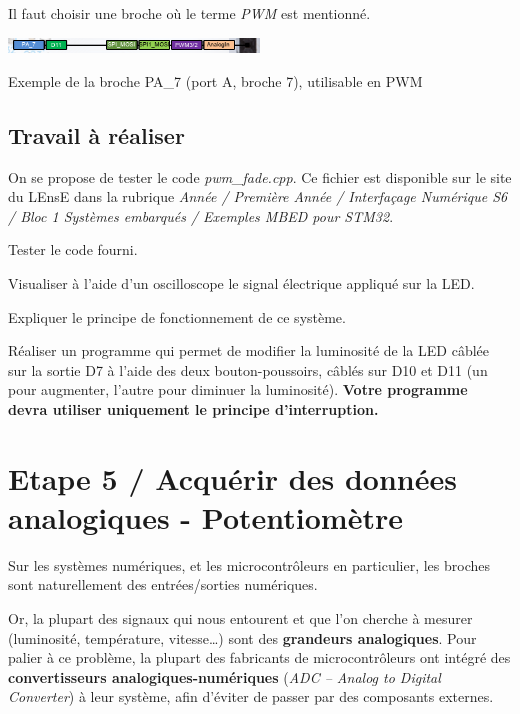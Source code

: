 \documentclass[a4paper,11pt,titlepage]{article} %
\begin{document}
Il faut choisir une broche où le terme \textit{PWM} est mentionné.

\begin{center}
	\includegraphics[width=0.5\textwidth]{images/nucleo_pin_functions.png}
	
	Exemple de la broche PA\_7 (port A, broche 7), utilisable en PWM
\end{center}

\subsection{Travail à réaliser}


On se propose de tester le code \textsl{pwm\_fade.cpp}. Ce fichier est disponible sur le site du LEnsE dans la rubrique \textit{Année / Première Année / Interfaçage Numérique S6 / Bloc 1 Systèmes embarqués / Exemples MBED pour STM32}.

\Manip Tester le code fourni. 

\Manip Visualiser à l'aide d'un oscilloscope le signal électrique appliqué sur la LED.

\Quest Expliquer le principe de fonctionnement de ce système.

\Manip Réaliser un programme qui permet de modifier la luminosité de la LED câblée sur la sortie D7 à l'aide des deux bouton-poussoirs, câblés sur D10 et D11 (un pour augmenter, l'autre pour diminuer la luminosité). \textbf{Votre programme devra utiliser uniquement le principe d'interruption.}


\newpage
\section{Etape 5 / Acquérir des données analogiques - Potentiomètre}

Sur les systèmes numériques, et les microcontrôleurs en particulier, les broches sont naturellement des entrées/sorties numériques.

Or, la plupart des signaux qui nous entourent et que l'on cherche à mesurer (luminosité, température, vitesse…) sont des \textbf{grandeurs analogiques}. Pour palier à ce problème, la plupart des fabricants de microcontrôleurs ont intégré des \textbf{convertisseurs analogiques-numériques} (\textit{ADC – Analog to Digital Converter}) à leur système, afin d'éviter de passer par des composants externes.
\end{document}
